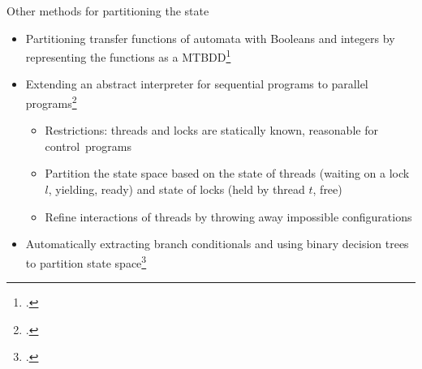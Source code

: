 \documentclass[aspectratio=169]{beamer}
\begin{document}
\begin{frame}{Other methods for partitioning the state}
  \begin{itemize}[<+->]
  \item Partitioning transfer functions of automata with Booleans and integers by representing the functions as a MTBDD\footcite{jeannet_representing_2002}
  \item Extending an abstract interpreter for sequential programs to parallel programs\footcite{mine2011static}
    \begin{itemize}
    \item Restrictions: threads and locks are statically known, reasonable for control~programs
    \item Partition the state space based on the state of threads (waiting on a lock $l$, yielding, ready) and state of locks (held by thread $t$, free)
    \item Refine interactions of threads by throwing away impossible configurations
    \end{itemize}
  \item Automatically extracting branch conditionals and using binary decision trees to partition state space\footcite{chen2015binary}
  \end{itemize}
\end{frame}
\end{document}

